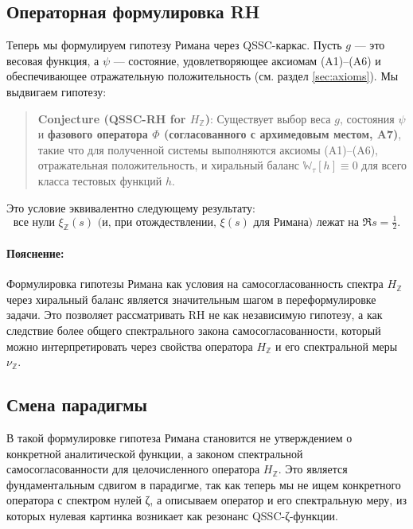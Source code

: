 \documentclass{article}
\numberwithin{equation}{section}
\theoremstyle{plain}
\theoremstyle{definition}
\theoremstyle{remark}
\begin{document}
\subsection{Операторная формулировка RH}
\label{subsec:operator-formulation}

\noindent
Теперь мы формулируем гипотезу Римана через QSSC-каркас. Пусть \( g \) — это весовая функция, а \( \psi \) — состояние, удовлетворяющее аксиомам (A1)–(A6) и обеспечивающее отражательную положительность (см. раздел \ref{sec:axioms}). Мы выдвигаем гипотезу:

\begin{quote}
\textbf{Conjecture (QSSC-RH for \( H_{\mathbb{Z}} \))}: Существует выбор веса \( g \), состояния \( \psi \) и \textbf{фазового оператора $\Phi$ (согласованного с архимедовым местом, A7)}, такие что для полученной системы выполняются аксиомы (A1)–(A6), отражательная положительность, и хиральный баланс \( \mathbb{W}_{\tau}[h] \equiv 0 \) для всего класса тестовых функций \( h \).
\end{quote}
\noindent
Это условие эквивалентно следующему результату:
\[
\text{все нули } \xi_{\mathbb{Z}}(s) \text{ (и, при отождествлении, } \xi(s) \text{ для Римана) лежат на } \Re s = \tfrac{1}{2}.
\]

\paragraph{Пояснение:}
\noindent
Формулировка гипотезы Римана как условия на самосогласованность спектра \( H_{\mathbb{Z}} \) через хиральный баланс является значительным шагом в переформулировке задачи. Это позволяет рассматривать RH не как независимую гипотезу, а как следствие более общего спектрального закона самосогласованности, который можно интерпретировать через свойства оператора \( H_{\mathbb{Z}} \) и его спектральной меры \( \nu_{\mathbb{Z}} \).

\subsection{Смена парадигмы}
\label{subsec:paradigm-shift}

\noindent
В такой формулировке гипотеза Римана становится не утверждением о конкретной аналитической функции, а законом спектральной самосогласованности для целочисленного оператора \( H_{\mathbb{Z}} \). Это является фундаментальным сдвигом в парадигме, так как теперь мы не ищем конкретного оператора с спектром нулей ζ, а описываем оператор и его спектральную меру, из которых нулевая картинка возникает как резонанс QSSC-ζ-функции.
\end{document}
